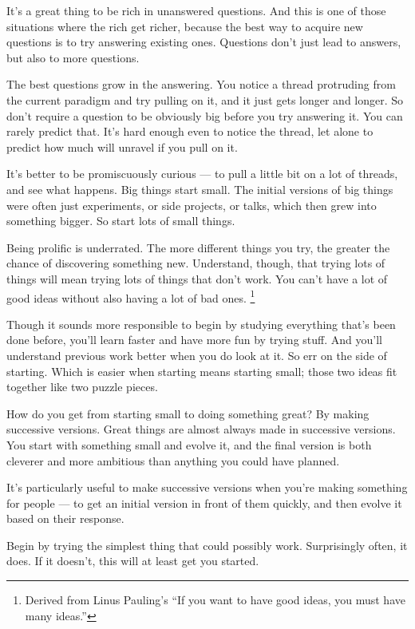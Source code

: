 It's a great thing to be rich in unanswered questions. And this is one
of those situations where the rich get richer, because the best way to
acquire new questions is to try answering existing ones. Questions don't
just lead to answers, but also to more questions.

The best questions grow in the answering. You notice a thread protruding
from the current paradigm and try pulling on it, and it just gets longer
and longer. So don't require a question to be obviously big before you
try answering it. You can rarely predict that. It's hard enough even to
notice the thread, let alone to predict how much will unravel if you
pull on it.

It's better to be promiscuously curious --- to pull a little bit on a
lot of threads, and see what happens. Big things start small. The
initial versions of big things were often just experiments, or side
projects, or talks, which then grew into something bigger. So start lots
of small things.

Being prolific is underrated. The more different things you try, the
greater the chance of discovering something new. Understand, though,
that trying lots of things will mean trying lots of things that don't
work. You can't have a lot of good ideas without also having a lot of
bad ones. \footnote{Derived from Linus Pauling's ``If you want to have good ideas,
you must have many ideas.''}

Though it sounds more responsible to begin by studying everything that's
been done before, you'll learn faster and have more fun by trying stuff.
And you'll understand previous work better when you do look at it. So
err on the side of starting. Which is easier when starting means
starting small; those two ideas fit together like two puzzle pieces.

How do you get from starting small to doing something great? By making
successive versions. Great things are almost always made in successive
versions. You start with something small and evolve it, and the final
version is both cleverer and more ambitious than anything you could have
planned.

It's particularly useful to make successive versions when you're making
something for people --- to get an initial version in front of them
quickly, and then evolve it based on their response.

Begin by trying the simplest thing that could possibly work.
Surprisingly often, it does. If it doesn't, this will at least get you
started.

